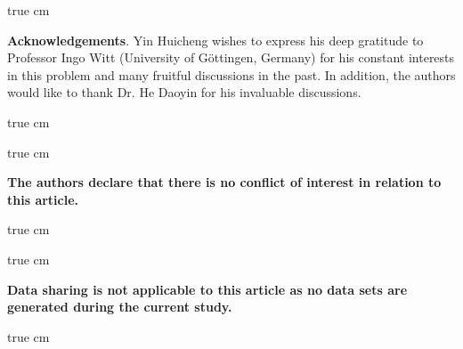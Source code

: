 \documentclass[11pt,twoside]{article}
\theoremstyle{plain}
\theoremstyle{definition}
\theoremstyle{remark}
\numberwithin{equation}{section}
\begin{document}
 true cm

{\bf Acknowledgements}. Yin Huicheng wishes to express his deep gratitude to Professor Ingo Witt
(University of G\"ottingen, Germany) for his constant interests in this problem and many fruitful discussions in the past.
In addition, the authors would like to thank Dr. He Daoyin  for his invaluable discussions.



 true cm

{\bf \color{blue}{Conflict of Interest Statement:}}

 true cm

{\bf The authors declare that there is no conflict of interest in relation to this article.}

 true cm
{\bf \color{blue}{Data availability statement:}}

 true cm

{\bf  Data sharing is not applicable to this article as no data sets are generated
during the current study.}


 true cm
\end{document}
